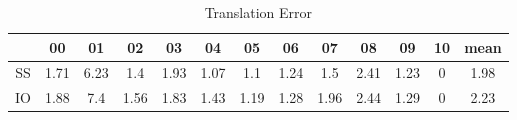 \begin{table}[H!]
\centering
\begin{tabular}{|c|c|c|c|c|c|c|c|c|c|c|c|c|}
\hline
 & 00 & 01 & 02 & 03 & 04 & 05 & 06 & 07 & 08 & 09 & 10 & mean \\
\hline
SS & 1.71 & 6.23 & 1.4 & 1.93 & 1.07 & 1.1 & 1.24 & 1.5 & 2.41 & 1.23 & 0 & 1.98 \\
\hline
IO & 1.88 & 7.4 & 1.56 & 1.83 & 1.43 & 1.19 & 1.28 & 1.96 & 2.44 & 1.29 & 0 & 2.23 \\
\hline
\end{tabular}
\caption{Translation Error}
\label{table:fig:r_err}
\end{table}
